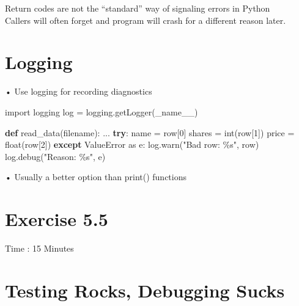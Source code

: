 \documentclass[
  letterpaper,
  DIV=11,
  numbers=noendperiod]{scrreprt}
\newenvironment{Shaded}{\begin{snugshade}}{\end{snugshade}}
\newcommand{\BuiltInTok}[1]{\textcolor[rgb]{0.00,0.23,0.31}{#1}}
\newcommand{\ControlFlowTok}[1]{\textcolor[rgb]{0.00,0.23,0.31}{\textbf{#1}}}
\newcommand{\DecValTok}[1]{\textcolor[rgb]{0.68,0.00,0.00}{#1}}
\newcommand{\ImportTok}[1]{\textcolor[rgb]{0.00,0.46,0.62}{#1}}
\newcommand{\KeywordTok}[1]{\textcolor[rgb]{0.00,0.23,0.31}{\textbf{#1}}}
\newcommand{\NormalTok}[1]{\textcolor[rgb]{0.00,0.23,0.31}{#1}}
\newcommand{\OperatorTok}[1]{\textcolor[rgb]{0.37,0.37,0.37}{#1}}
\newcommand{\PreprocessorTok}[1]{\textcolor[rgb]{0.68,0.00,0.00}{#1}}
\newcommand{\SpecialCharTok}[1]{\textcolor[rgb]{0.37,0.37,0.37}{#1}}
\newcommand{\StringTok}[1]{\textcolor[rgb]{0.13,0.47,0.30}{#1}}
\begin{document}
Return codes are not the ``standard'' way of signaling errors in
Python\\
Callers will often forget and program will crash for a different reason
later.


\chapter{Logging}\label{logging}

• Use logging for recording diagnostics

\begin{Shaded}
\begin{Highlighting}[]
\ImportTok{import}\NormalTok{ logging  }
\NormalTok{log }\OperatorTok{=}\NormalTok{ logging.getLogger(\_name\_\_) }
\end{Highlighting}
\end{Shaded}

\begin{Shaded}
\begin{Highlighting}[]
\KeywordTok{def}\NormalTok{ read\_data(filename):}
\NormalTok{    ...}
    \ControlFlowTok{try}\NormalTok{:}
\NormalTok{        name }\OperatorTok{=}\NormalTok{ row[}\DecValTok{0}\NormalTok{]}
\NormalTok{        shares }\OperatorTok{=} \BuiltInTok{int}\NormalTok{(row[}\DecValTok{1}\NormalTok{])}
\NormalTok{        price }\OperatorTok{=} \BuiltInTok{float}\NormalTok{(row[}\DecValTok{2}\NormalTok{])}
    \ControlFlowTok{except} \PreprocessorTok{ValueError} \ImportTok{as}\NormalTok{ e:}
\NormalTok{        log.warn(}\StringTok{"Bad row: }\SpecialCharTok{\%s}\StringTok{"}\NormalTok{, row)}
\NormalTok{        log.debug(}\StringTok{"Reason: }\SpecialCharTok{\%s}\StringTok{"}\NormalTok{, e) }
\end{Highlighting}
\end{Shaded}

• Usually a better option than print() functions


\chapter{Exercise 5.5}\label{exercise-5.5}

Time : 15 Minutes


\chapter{Testing Rocks, Debugging
Sucks}\label{testing-rocks-debugging-sucks}
\end{document}
